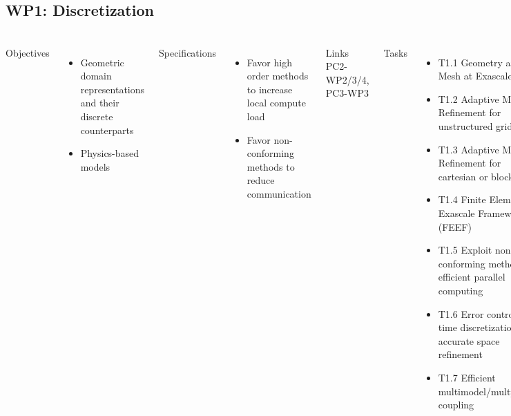 \subsection{WP1: Discretization}
\begin{frame}
  \frametitle{\insertsectionhead}
  \framesubtitle{\insertsubsectionhead}
  \footnotesize
  \begin{columns}[t]
    Objectives
    \begin{itemize}
      \item Geometric domain representations and their discrete counterparts 
      \item Physics-based models 
    \end{itemize}
    Specifications
    \begin{itemize}
      \item Favor high order methods to increase local compute load
      \item Favor non-conforming methods to reduce communication
    \end{itemize}
    \begin{alertblock}{Links}
      PC2-WP2/3/4, PC3-WP3 
    \end{alertblock}
    Tasks
    \begin{itemize}
      \item T1.1	Geometry and Mesh at Exascale
      \item T1.2	Adaptive Mesh Refinement for unstructured grids 
      \item T1.3	Adaptive Mesh Refinement for cartesian or block grids
      \item T1.4	Finite Element Exascale Framework (FEEF)
      \item T1.5	Exploit non conforming methods for efficient parallel computing
      \item T1.6	Error control of time discretization for accurate space refinement
      \item T1.7	Efficient multimodel/multphysics coupling
    \end{itemize}


  \end{columns}
\end{frame}


